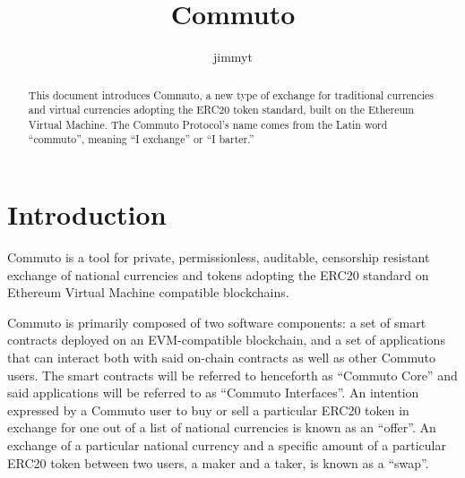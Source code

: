 \documentclass[11pt]{article}
\author{jimmyt}
\begin{document}
    \title{Commuto}
    \maketitle

    \begin{abstract}
    This document introduces Commuto, a new type of exchange for traditional currencies and virtual
    currencies adopting the ERC20 token standard, built on the Ethereum Virtual Machine.
    The Commuto Protocol's name comes from the Latin word ``commuto'', meaning ``I exchange'' or ``I
    barter.''
    \end{abstract}

    \section*{Introduction}

    Commuto is a tool for private, permissionless, auditable, censorship resistant exchange of
    national currencies and tokens adopting the ERC20\cite{ERC20} standard on Ethereum Virtual
    Machine\cite{Ethereum} compatible blockchains.

    Commuto is primarily composed of two software components: a set of smart contracts deployed on
    an EVM-compatible blockchain, and a set of applications that can interact both with said
    on-chain contracts as well as other Commuto users.
    The smart contracts will be referred to henceforth as ``Commuto Core'' and said applications
    will be referred to as ``Commuto Interfaces''.
    An intention expressed by a Commuto user to buy or sell a particular ERC20 token in exchange for
    one out of a list of national currencies is known as an ``offer''.
    An exchange of a particular national currency and a specific amount of a particular ERC20 token
    between two users, a maker and a taker, is known as a ``swap''.
\end{document}
